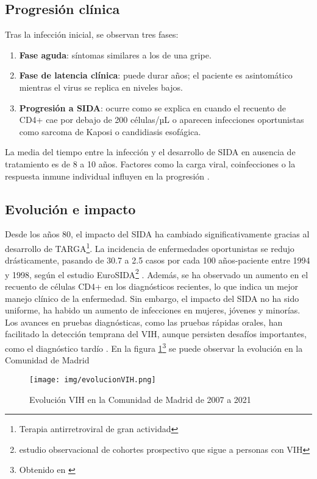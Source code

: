 \begin{enumerate}
\subsection{Progresión clínica}
Tras la infección inicial, se observan tres fases:
\begin{enumerate}
    \item \textbf{Fase aguda}: síntomas similares a los de una gripe.
    \item \textbf{Fase de latencia clínica}: puede durar años; el paciente es asintomático mientras el virus se replica en niveles bajos.
    \item \textbf{Progresión a SIDA}: ocurre como se explica en \cite{okoye2013cd} cuando el recuento de CD4+ cae por debajo de 200 células/µL o aparecen infecciones oportunistas como sarcoma de Kaposi o candidiasis esofágica.
\end{enumerate}
La media del tiempo entre la infección y el desarrollo de SIDA en ausencia de tratamiento es de 8 a 10 años. Factores como la carga viral, coinfecciones o la respuesta inmune individual influyen en la progresión \cite{hoover1992progression}.

\subsection{Evolución e impacto}
Desde los años 80, el impacto del SIDA ha cambiado significativamente gracias al desarrollo de TARGA\footnote{Terapia antirretroviral de gran actividad}. La incidencia de enfermedades oportunistas se redujo drásticamente, pasando de 30.7 a 2.5 casos por cada 100 años-paciente entre 1994 y 1998, según el estudio EuroSIDA\footnote{estudio observacional de cohortes prospectivo que sigue a personas con VIH} \cite{mocroft2000aids}. Además, se ha observado un aumento en el recuento de células CD4+ en los diagnósticos recientes, lo que indica un mejor manejo clínico de la enfermedad. Sin embargo, el impacto del SIDA no ha sido uniforme, ha habido un aumento de infecciones en mujeres, jóvenes y minorías. Los avances en pruebas diagnósticas, como las pruebas rápidas orales, han facilitado la detección temprana del VIH, aunque persisten desafíos importantes, como el diagnóstico tardío \cite{san2003incidence}.
En la figura \ref{fig:evolución vih}\footnote{Obtenido en \cite{madrid_salud_poblacion}} se puede observar la evolución en la Comunidad de Madrid 

\begin{figure}[H]
    \centering
    \texttt{[image: img/evolucionVIH.png]}
    \caption{Evolución VIH en la Comunidad de Madrid de 2007 a 2021}
    \label{fig:evolución vih}
    \vspace{0.5cm} %
\end{figure}


\end{enumerate}
